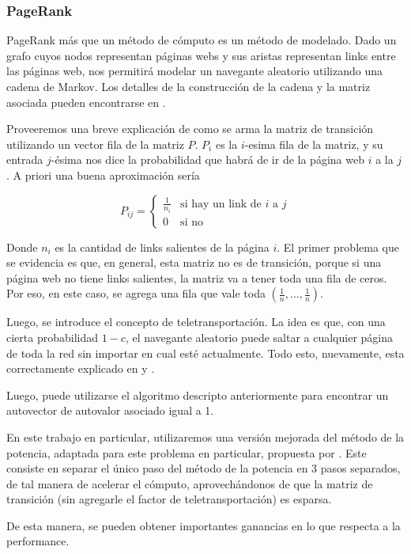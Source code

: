 \subsubsection{PageRank}
PageRank más que un m\'etodo de cómputo es un m\'etodo de modelado. Dado un grafo cuyos nodos representan páginas webs y sus aristas representan links entre las páginas web, nos permitirá modelar un navegante aleatorio utilizando una cadena de Markov. 
Los detalles de la construcción de la cadena y la matriz asociada pueden encontrarse en \cite{Brin1998}.

Proveeremos una breve explicación de como se arma la matriz de transición utilizando un vector fila de la matriz $P$. 
$P_i$ es la $i$-esima fila de la matriz, y su entrada $j$-ésima nos dice la probabilidad que habrá de ir de la página web $i$ a la $j$. A priori una buena aproximación sería

\[ P_{ij} = \begin{cases} 
      \frac{1}{n_i} & \text{si hay un link de $i$ a $j$} \\
       0 & \text{si no}
   \end{cases}
\] 

Donde $n_i$ es la cantidad de links salientes de la página $i$.
El primer problema que se evidencia es que, en general, esta matriz no es de transición, porque si una página web no tiene links salientes, la matriz va a tener toda una fila de ceros. Por eso, en este caso, se agrega una fila que vale toda $(\frac1n, ..., \frac1n)$.

Luego, se introduce el concepto de teletransportación. La idea es que, con una cierta probabilidad $1-c$, el navegante aleatorio puede saltar a cualquier página de toda la red sin importar en cual esté actualmente. Todo esto, nuevamente, esta correctamente explicado en \cite{Brin1998} y \cite{Kamvar2003}.

Luego, puede utilizarse el algoritmo descripto anteriormente para encontrar un autovector de autovalor asociado igual a 1.

En este trabajo en particular, utilizaremos una versión mejorada del m\'etodo de la potencia, adaptada para este problema en particular, propuesta por \cite{Kamvar2003}. Este consiste en separar el único paso del método de la potencia en 3 pasos separados, de tal manera de acelerar el cómputo, aprovechándonos de que la matriz de transición (sin agregarle el factor de teletransportación) es esparsa.

De esta manera, se pueden obtener importantes ganancias en lo que respecta a la performance.

